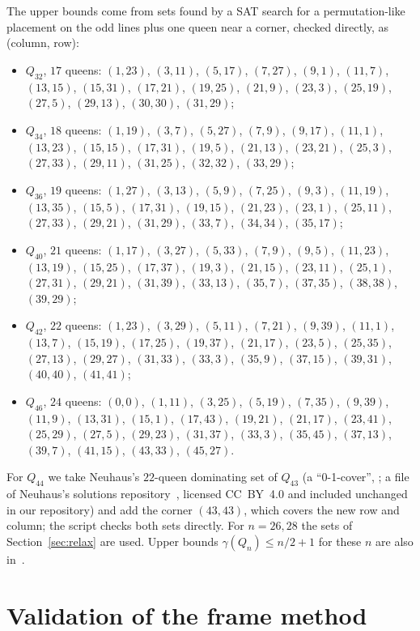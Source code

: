 \documentclass[11pt]{article}
\theoremstyle{definition}
\theoremstyle{remark}
\begin{document}
The upper bounds come from sets found by a SAT search for a permutation-like placement on the odd lines
plus one queen near a corner, checked directly, as (column, row):
\begin{itemize}
\item $Q_{32}$, $17$ queens: $(1,23)$, $(3,11)$, $(5,17)$, $(7,27)$, $(9,1)$, $(11,7)$, $(13,15)$, $(15,31)$,
$(17,21)$, $(19,25)$, $(21,9)$, $(23,3)$, $(25,19)$, $(27,5)$, $(29,13)$, $(30,30)$, $(31,29)$;
\item $Q_{34}$, $18$ queens: $(1,19)$, $(3,7)$, $(5,27)$, $(7,9)$, $(9,17)$, $(11,1)$, $(13,23)$, $(15,15)$,
$(17,31)$, $(19,5)$, $(21,13)$, $(23,21)$, $(25,3)$, $(27,33)$, $(29,11)$, $(31,25)$, $(32,32)$, $(33,29)$;
\item $Q_{36}$, $19$ queens: $(1,27)$, $(3,13)$, $(5,9)$, $(7,25)$, $(9,3)$, $(11,19)$, $(13,35)$, $(15,5)$,
$(17,31)$, $(19,15)$, $(21,23)$, $(23,1)$, $(25,11)$, $(27,33)$, $(29,21)$, $(31,29)$, $(33,7)$, $(34,34)$, $(35,17)$;
\item $Q_{40}$, $21$ queens: $(1,17)$, $(3,27)$, $(5,33)$, $(7,9)$, $(9,5)$, $(11,23)$, $(13,19)$, $(15,25)$,
$(17,37)$, $(19,3)$, $(21,15)$, $(23,11)$, $(25,1)$, $(27,31)$, $(29,21)$, $(31,39)$, $(33,13)$, $(35,7)$, $(37,35)$,
$(38,38)$, $(39,29)$;
\item $Q_{42}$, $22$ queens: $(1,23)$, $(3,29)$, $(5,11)$, $(7,21)$, $(9,39)$, $(11,1)$, $(13,7)$, $(15,19)$,
$(17,25)$, $(19,37)$, $(21,17)$, $(23,5)$, $(25,35)$, $(27,13)$, $(29,27)$, $(31,33)$, $(33,3)$, $(35,9)$, $(37,15)$,
$(39,31)$, $(40,40)$, $(41,41)$;
\item $Q_{46}$, $24$ queens: $(0,0)$, $(1,11)$, $(3,25)$, $(5,19)$, $(7,35)$, $(9,39)$, $(11,9)$, $(13,31)$,
$(15,1)$, $(17,43)$, $(19,21)$, $(21,17)$, $(23,41)$, $(25,29)$, $(27,5)$, $(29,23)$, $(31,37)$, $(33,3)$, $(35,45)$,
$(37,13)$, $(39,7)$, $(41,15)$, $(43,33)$, $(45,27)$.
\end{itemize}
For $Q_{44}$ we take Neuhaus's $22$-queen dominating set of $Q_{43}$ (a ``0-1-cover'', \cite[App.~B]{Neuhaus};
a file of Neuhaus's solutions repository~\cite{NeuhausSol}, licensed CC~BY~4.0 and included unchanged
in our repository) and add the corner $(43,43)$, which covers the new row and column; the
script checks both sets directly. For $n=26,28$ the sets of Section~\ref{sec:relax} are used. Upper
bounds $\gamma(Q_n)\le n/2+1$ for these $n$ are also in~\cite{OW,Weakley2022}.

\section{Validation of the frame method}\label{sec:fvalid}
\end{document}
